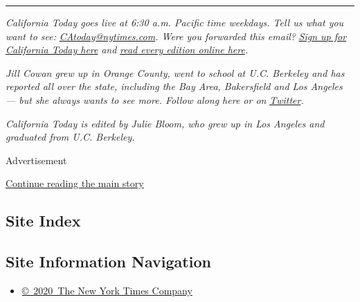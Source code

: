 \begin{center}\rule{0.5\linewidth}{\linethickness}\end{center}

\emph{California Today goes live at 6:30 a.m. Pacific time weekdays.
Tell us what you want to see:}
\href{mailto:CAtoday@nytimes.com}{\emph{CAtoday@nytimes.com}}\emph{.
Were you forwarded this email?}
\href{https://www.nytimes.com/newsletters/california-today?module=inline}{\emph{Sign
up for California Today here}} \emph{and}
\href{https://www.nytimes.com/column/california-today}{\emph{read every
edition online here}}\emph{.}

\emph{Jill Cowan grew up in Orange County, went to school at U.C.
Berkeley and has reported all over the state, including the Bay Area,
Bakersfield and Los Angeles --- but she always wants to see more. Follow
along here or on}
\href{https://twitter.com/JillCowan}{\emph{Twitter}}\emph{.}

\emph{California Today is edited by Julie Bloom, who grew up in Los
Angeles and graduated from U.C. Berkeley.}

Advertisement

\protect\hyperlink{after-bottom}{Continue reading the main story}

\hypertarget{site-index}{%
\subsection{Site Index}\label{site-index}}

\hypertarget{site-information-navigation}{%
\subsection{Site Information
Navigation}\label{site-information-navigation}}

\begin{itemize}
\tightlist
\item
  \href{https://help.nytimes.com/hc/en-us/articles/115014792127-Copyright-notice}{©~2020~The
  New York Times Company}
\end{itemize}

